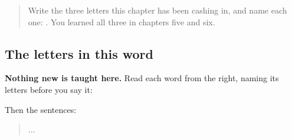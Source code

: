 \label{lesson:UR-C17-practice}



\begin{quote}
Write the three letters this chapter has been cashing in, and name each one:   . You learned all three in chapters five and six.
\end{quote}

\subsection*{The letters in this word}
\textbf{Nothing new is taught here.} Read each word from the right, naming its letters before you say it:

\begin{quote}
\end{quote}

\begin{quote}
\end{quote}

\begin{quote}
\end{quote}

\begin{quote}
\end{quote}

\begin{quote}
\end{quote}

\begin{quote}
\end{quote}

\begin{quote}
\end{quote}

\begin{quote}
\end{quote}

Then the sentences:

\begin{quote}
  ... 
\end{quote}

\begin{quote}
   
\end{quote}

\begin{quote}
  
\end{quote}

